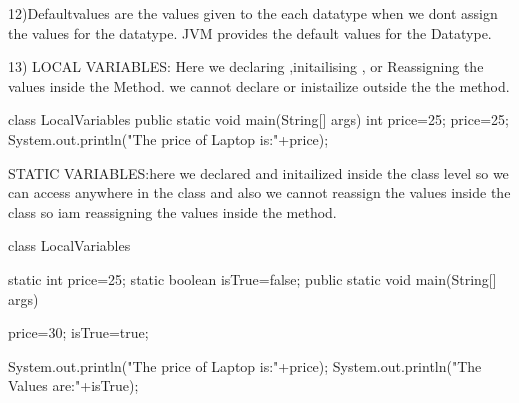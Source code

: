 12)Defaultvalues are the values given to the each datatype when we dont assign the values for the  datatype.
   JVM provides the default values for the Datatype.
   
13)   LOCAL VARIABLES: Here we declaring ,initailising , or Reassigning the values inside the Method. we cannot declare or inistailize outside the 
                       the method.

       class LocalVariables{
		   public static void main(String[] args){
			   int price=25;
			   price=25;
			   System.out.println("The price of Laptop is:"+price);
		   }
	   }
	   
	   
	   STATIC VARIABLES:here we declared and initailized inside the class level so we can access anywhere in the class and also we cannot reassign the
	                    values inside the class so iam reassigning the values inside the method.
	   
	   
	    class LocalVariables{
			static int price=25;
			static boolean isTrue=false;
		   public static void main(String[] args){
			   price=30;
			   isTrue=true;
			   
			   System.out.println("The price of Laptop is:"+price);
			   System.out.println("The Values are:"+isTrue);
		   }
	   }
	   

